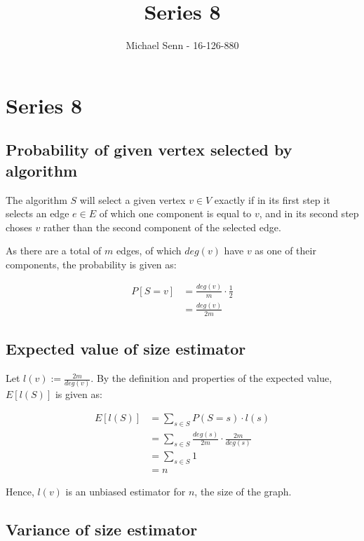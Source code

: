 \documentclass[a4paper]{scrreprt}
\title{Series 8}
\author{Michael Senn \maillink{michael.senn@students.unibe.ch} - 16-126-880}
\date{\printdate}
\begin{document}
\maketitle


\setcounter{chapter}{7}
\chapter{Series 8}

\section{Probability of given vertex selected by algorithm}

The algorithm $S$ will select a given vertex $v \in V$ exactly if in its first
step it selects an edge $e \in E$ of which one component is equal to $v$, and
in its second step choses $v$ rather than the second component of the selected
edge.

As there are a total of $m$ edges, of which $deg(v)$ have $v$ as one of their 
components, the probability is given as:

\begin{align*}
	P[S = v] & = \frac{deg(v)}{m} \cdot \frac{1}{2} \\
		 & = \frac{deg(v)}{2m}
\end{align*}

\section{Expected value of size estimator}

Let $l(v) := \frac{2m}{deg(v)}$. By the definition and properties of the
expected value, $E[l(S)]$ is given as:

\begin{align*}
	E[l(S)] & = \sum_{s \in S}{P(S = s) \cdot l(s)} \\
		& = \sum_{s \in S}{\frac{deg(s)}{2m} \cdot \frac{2m}{deg(s)}} \\
		& = \sum_{s \in S}{1} \\
		& = n
\end{align*}

Hence, $l(v)$ is an unbiased estimator for $n$, the size of the graph.

\section{Variance of size estimator}
\end{document}
